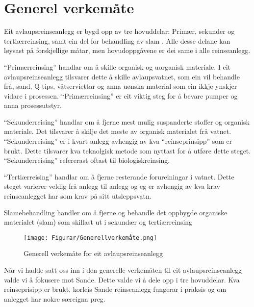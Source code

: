 \section{Generel verkemåte}

Eit avlaupsreinseanlegg er bygd opp av tre hovuddelar: Primær, sekunder og tertiærreinsing,
samt ein del for behandling av slam \citep{Regjeriga}.
Alle desse delane kan løysast på forskjellige måtar, men hovudoppgåvene er dei same
i alle reinseanlegg.

``Primærreinsing'' handlar om å skille organisk og uorganisk materiale.
I eit avlaupsreinseanlegg tilsvarer dette å skille avlaupsvatnet, 
som ein vil behandle frå, sand, Q-tips, våtserviettar
og anna uønska material som ein ikkje ynskjer vidare i prosessen.\newline
``Primærreinsing'' er eit viktig steg for å bevare pumper og anna prosessutstyr.

``Sekunderreising'' handlar om å fjerne mest mulig suspanderte stoffer og organisk materiale.
Det tilsvarer å skilje det meste av organisk materialet frå vatnet.
``Sekunderreising'' er i kvart anlegg avhengig av kva ``reinseprinsipp'' som er brukt. Dette tilsvarer
kva teknolgisk metode som nyttast for å utføre dette steget.
``Sekunderreising'' refererast oftast til biologiskreinsing.

``Tertiærreising'' handlar om å fjerne resterande forureiningar i vatnet.
Dette steget varierer veldig frå anlegg til anlegg og eg er
avhengig av kva krav reinseanlegget har som krav på sitt utsleppsvatn.

Slamebehandling handler om å fjerne og behandle det oppbygde organiske materialet (slam)
som skillast ut i sekundær og tertiærreinsing 

\begin{figure}[htbp]
    \centering
    \texttt{[image: Figurar/Generellverkemåte.png]}
    \caption{Generell verkemåte for eit avlaupsreinseanlegg}\label{fig:GenerellVerkemåte}
\end{figure}

Når vi hadde satt oss inn i den generelle verkemåten til eit avlaupsreinseanlegg
valde vi å fokusere mot Sande.
Dette valde vi å dele opp i tre hovuddelar. Kva reinseprisipp er brukt, korleis Sande reinseanlegg
fungerar i praksis og om anlegget har nokre særeigna preg.
